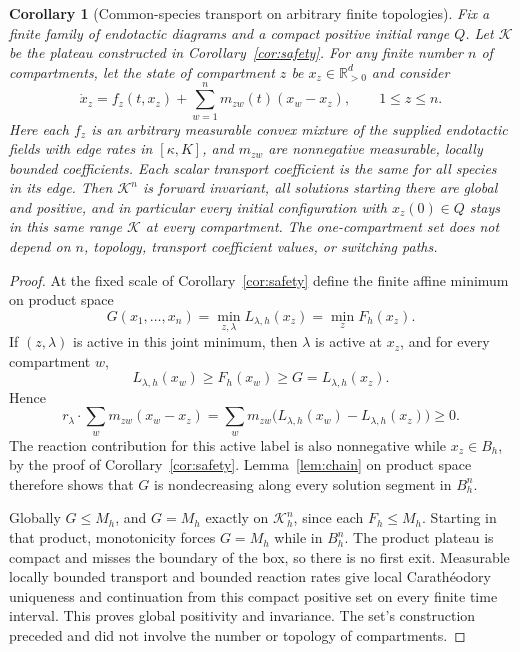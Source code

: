 \documentclass[11pt]{article}
\newtheorem{corollary}[theorem]{Corollary}
\theoremstyle{definition}
\theoremstyle{remark}
\newcommand{\R}{\mathbb R}
\numberwithin{equation}{section}
\begin{document}
\begin{corollary}[Common-species transport on arbitrary finite topologies]
\label{cor:transport}
Fix a finite family of endotactic diagrams and a compact
positive initial range $Q$. Let $\mathcal K$ be the plateau
constructed in Corollary~\ref{cor:safety}. For any finite
number $n$ of compartments, let the state of compartment $z$
be $x_z\in\R_{>0}^d$ and consider
\begin{equation}
 \dot x_z=f_z(t,x_z)+\sum_{w=1}^n m_{zw}(t)(x_w-x_z),
 \qquad 1\leq z\leq n.
 \label{eq:compartments}
\end{equation}
Here each $f_z$ is an arbitrary measurable convex mixture
of the supplied endotactic fields with edge rates in
$[\kappa,K]$, and $m_{zw}$ are nonnegative measurable,
locally bounded coefficients. Each scalar transport
coefficient is the same for all species in its edge.
Then $\mathcal K^n$ is forward invariant, all solutions
starting there are global and positive, and in particular
every initial configuration with $x_z(0)\in Q$ stays in
this same range $\mathcal K$ at every compartment. The
one-compartment set does not depend on $n$, topology,
transport coefficient values, or switching paths.
\end{corollary}
\begin{proof}
At the fixed scale of Corollary~\ref{cor:safety} define the
finite affine minimum on product space
\[
 G(x_1,\ldots,x_n)=\min_{z,\lambda}L_{\lambda,h}(x_z)
                  =\min_z F_h(x_z).
\]
If $(z,\lambda)$ is active in this joint minimum, then
$\lambda$ is active at $x_z$, and for every compartment $w$,
\[
 L_{\lambda,h}(x_w)\geq F_h(x_w)\geq G
                         =L_{\lambda,h}(x_z).
\]
Hence
\[
 r_\lambda\cdot\sum_w m_{zw}(x_w-x_z)
   =\sum_w m_{zw}\bigl(L_{\lambda,h}(x_w)
                         -L_{\lambda,h}(x_z)\bigr)\geq0.
\]
The reaction contribution for this active label is also
nonnegative while $x_z\in B_h$, by the proof of
Corollary~\ref{cor:safety}. Lemma~\ref{lem:chain} on product
space therefore shows that $G$ is nondecreasing along every
solution segment in $B_h^n$.

Globally $G\leq M_h$, and $G=M_h$ exactly on
$\mathcal K_h^n$, since each $F_h\leq M_h$. Starting in that
product, monotonicity forces $G=M_h$ while in $B_h^n$.
The product plateau is compact and misses the boundary of
the box, so there is no first exit. Measurable locally
bounded transport and bounded reaction rates give local
Carath\'eodory uniqueness and continuation from this compact
positive set on every finite time interval. This proves
global positivity and invariance. The set's construction
preceded and did not involve the number or topology of
compartments.
\end{proof}
\end{document}
